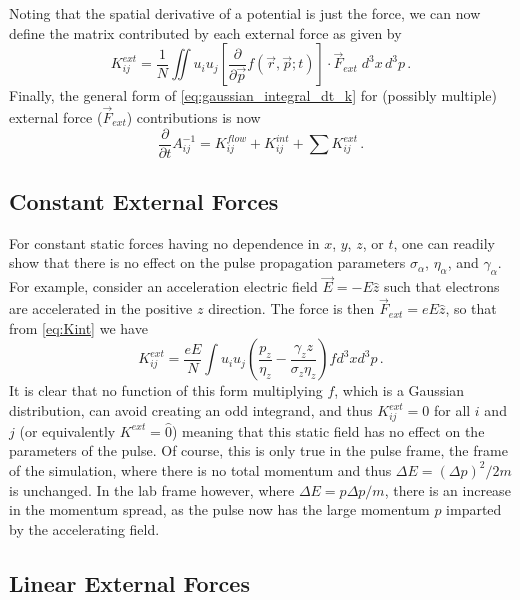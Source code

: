 Noting that the spatial derivative of a potential is just the force, we can now define the matrix contributed by each external force as given by
\begin{equation} \label{eq:Kint}
  K^{ext}_{ij} = \frac{1}{N} \iint u_i u_j \left [ \frac{\partial}{\partial \vec{p}} f(\vec{r}, \vec{p}; t) \right ] \cdot \vec{F}_{ext}\;d^{3}x\,d^{3}p \,\text{.}
\end{equation}
Finally, the general form of \ref{eq:gaussian_integral_dt_k} for (possibly multiple) external force ($\vec{F}_{ext}$) contributions is now
\begin{equation}
  \frac{\partial}{\partial t} A^{-1}_{ij} = K^{flow}_{ij} + K^{int}_{ij} + \sum K^{ext}_{ij} \,\text{.}
\end{equation}

\subsection{Constant External Forces} \label{sec:const_force}

For constant static forces having no dependence in $ x $, $ y $, $ z $, or $ t $, one can readily show that there is no effect on the pulse propagation parameters $ \sigma_{ \alpha } $, $ \eta_{ \alpha } $, and $ \gamma_{ \alpha } $.
For example, consider an acceleration electric field $ \vec{E} = -E \hat{z} $ such that electrons are accelerated in the positive $ z $ direction.
The force is then $ \vec{F}_{ext} = e E \hat{z} $, so that from \ref{eq:Kint} we have
\begin{equation}
  K^{ext}_{ij} = \frac{e E} {N} \int{ u_{i} u_{j} \left( \frac{p_{z}} {\eta_{z}} - \frac{\gamma_{z} z} {\sigma_{z} \eta_{z}} \right) f d^{3}x d^{3}p } \,\text{.}
\end{equation}
It is clear that no function of this form multiplying $ f $, which is a Gaussian distribution, can avoid creating an odd integrand, and thus $ K_{ij}^{ext} = 0 $ for all $ i $ and $ j $ (or equivalently $ K^{ext} = \hat{0} $) meaning that this static field has no effect on the parameters of the pulse.
Of course, this is only true in the pulse frame, the frame of the simulation, where there is no total momentum and thus $ \Delta E = \left( \Delta p \right)^{2} / 2 m $ is unchanged.
In the lab frame however, where  $ \Delta E = p \Delta p / m $, there is an increase in the momentum spread, as the pulse now has the large momentum $p$ imparted by the accelerating field.

\subsection{Linear External Forces}

